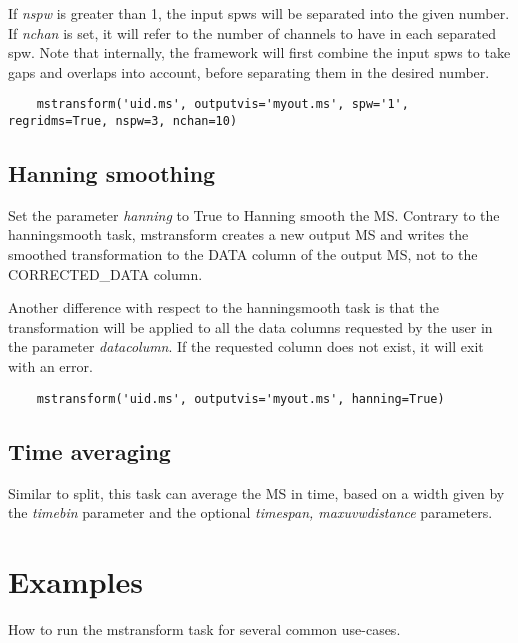 If {\it nspw} is greater than 1, the input spws will be separated into the given
number. If {\it nchan} is set, it will refer to the number of channels to have in each
separated spw. Note that internally, the framework will first combine the input
spws to take gaps and overlaps into account, before separating them in the desired
number.

\begin{verbatim}
    mstransform('uid.ms', outputvis='myout.ms', spw='1', regridms=True, nspw=3, nchan=10)
\end{verbatim}

\subsection{Hanning smoothing}
Set the parameter {\it hanning} to True to Hanning smooth the MS. Contrary to the
hanningsmooth task, mstransform creates a new output MS and writes the smoothed transformation
to the DATA column of the output MS, not to the CORRECTED_DATA column.

Another difference with respect to the hanningsmooth task is that the transformation will be 
applied to all the data columns requested by the user in the parameter {\it datacolumn}. If the 
requested column does not exist, it will exit with an error. 

\begin{verbatim}
    mstransform('uid.ms', outputvis='myout.ms', hanning=True)
\end{verbatim}

\subsection{Time averaging}
Similar to split, this task can average the MS in time, based on a width given by the
{\it timebin} parameter and the optional {\it timespan, maxuvwdistance}
parameters.



\section{Examples}\label{Sec:Examples}
How to run the mstransform task for several common use-cases.

